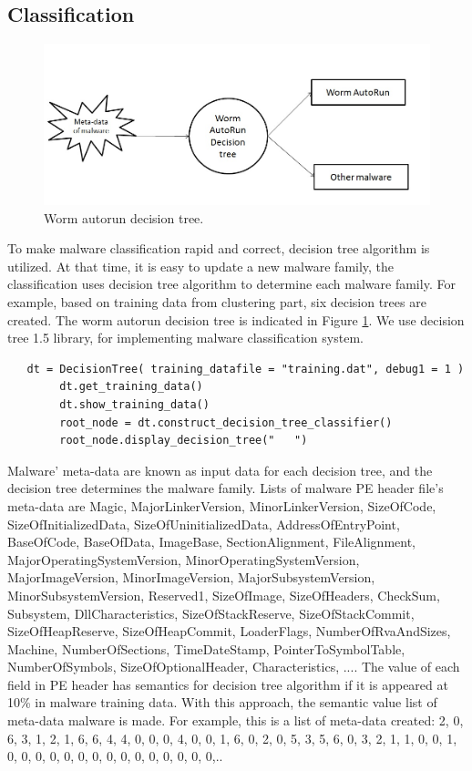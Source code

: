 \subsection{Classification}
\begin{figure}[h!]
\centering
\includegraphics[width=1\textwidth]{graph/classificationdecision.jpg}
\caption{Worm autorun decision tree.}
\label{fig:classificationdecision}
\end{figure}

To make malware classification rapid and correct, decision tree algorithm is utilized. At that time, it is easy to update a new malware family, the classification uses decision tree algorithm to determine each malware family. For example, based on training data from clustering part, six decision trees are created. The worm autorun decision tree is indicated in Figure \ref{fig:classificationdecision}.
We use decision tree 1.5 library, for implementing malware classification system. 
\begin{verbatim}
   dt = DecisionTree( training_datafile = "training.dat", debug1 = 1 )
        dt.get_training_data()
        dt.show_training_data()
        root_node = dt.construct_decision_tree_classifier()
        root_node.display_decision_tree("   ")
\end{verbatim}
 
Malware' meta-data are known as input data for each decision tree, and the decision tree determines the malware family. Lists of malware PE header file's meta-data are Magic, MajorLinkerVersion, MinorLinkerVersion, SizeOfCode, SizeOfInitializedData, SizeOfUninitializedData, AddressOfEntryPoint, BaseOfCode, BaseOfData, ImageBase, SectionAlignment, FileAlignment, MajorOperatingSystemVersion, MinorOperatingSystemVersion, MajorImageVersion, MinorImageVersion, MajorSubsystemVersion, MinorSubsystemVersion, Reserved1, SizeOfImage, SizeOfHeaders, CheckSum, Subsystem, DllCharacteristics, SizeOfStackReserve, SizeOfStackCommit, SizeOfHeapReserve, SizeOfHeapCommit, LoaderFlags, NumberOfRvaAndSizes, Machine, NumberOfSections, TimeDateStamp, PointerToSymbolTable, NumberOfSymbols, SizeOfOptionalHeader, Characteristics, .... The value of each field in PE header has semantics for decision tree algorithm if it is appeared at 10\% in malware training data. With this approach, the semantic value list of meta-data malware is made. For example, this is a list of meta-data created: 2, 0, 6, 3, 1, 2, 1, 6, 6, 4, 4, 0, 0, 0, 4, 0, 0, 1, 6, 0, 2, 0, 5, 3, 5, 6, 0, 3, 2, 1, 1, 0, 0, 1, 0, 0, 0, 0, 0, 0, 0, 0, 0, 0, 0, 0, 0, 0, 0,..
 
